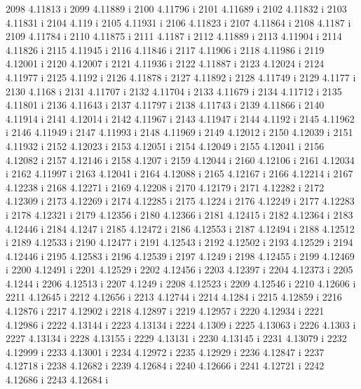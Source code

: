  2098  4.11813  i
 2099  4.11889  i
 2100  4.11796  i
 2101  4.11689  i
 2102  4.11832  i
 2103  4.11831  i
 2104  4.119  i
 2105  4.11931  i
 2106  4.11823  i
 2107  4.11864  i
 2108  4.1187  i
 2109  4.11784  i
 2110  4.11875  i
 2111  4.1187  i
 2112  4.11889  i
 2113  4.11904  i
 2114  4.11826  i
 2115  4.11945  i
 2116  4.11846  i
 2117  4.11906  i
 2118  4.11986  i
 2119  4.12001  i
 2120  4.12007  i
 2121  4.11936  i
 2122  4.11887  i
 2123  4.12024  i
 2124  4.11977  i
 2125  4.1192  i
 2126  4.11878  i
 2127  4.11892  i
 2128  4.11749  i
 2129  4.1177  i
 2130  4.1168  i
 2131  4.11707  i
 2132  4.11704  i
 2133  4.11679  i
 2134  4.11712  i
 2135  4.11801  i
 2136  4.11643  i
 2137  4.11797  i
 2138  4.11743  i
 2139  4.11866  i
 2140  4.11914  i
 2141  4.12014  i
 2142  4.11967  i
 2143  4.11947  i
 2144  4.1192  i
 2145  4.11962  i
 2146  4.11949  i
 2147  4.11993  i
 2148  4.11969  i
 2149  4.12012  i
 2150  4.12039  i
 2151  4.11932  i
 2152  4.12023  i
 2153  4.12051  i
 2154  4.12049  i
 2155  4.12041  i
 2156  4.12082  i
 2157  4.12146  i
 2158  4.1207  i
 2159  4.12044  i
 2160  4.12106  i
 2161  4.12034  i
 2162  4.11997  i
 2163  4.12041  i
 2164  4.12088  i
 2165  4.12167  i
 2166  4.12214  i
 2167  4.12238  i
 2168  4.12271  i
 2169  4.12208  i
 2170  4.12179  i
 2171  4.12282  i
 2172  4.12309  i
 2173  4.12269  i
 2174  4.12285  i
 2175  4.1224  i
 2176  4.12249  i
 2177  4.12283  i
 2178  4.12321  i
 2179  4.12356  i
 2180  4.12366  i
 2181  4.12415  i
 2182  4.12364  i
 2183  4.12446  i
 2184  4.1247  i
 2185  4.12472  i
 2186  4.12553  i
 2187  4.12494  i
 2188  4.12512  i
 2189  4.12533  i
 2190  4.12477  i
 2191  4.12543  i
 2192  4.12502  i
 2193  4.12529  i
 2194  4.12446  i
 2195  4.12583  i
 2196  4.12539  i
 2197  4.1249  i
 2198  4.12455  i
 2199  4.12469  i
 2200  4.12491  i
 2201  4.12529  i
 2202  4.12456  i
 2203  4.12397  i
 2204  4.12373  i
 2205  4.1244  i
 2206  4.12513  i
 2207  4.1249  i
 2208  4.12523  i
 2209  4.12546  i
 2210  4.12606  i
 2211  4.12645  i
 2212  4.12656  i
 2213  4.12744  i
 2214  4.1284  i
 2215  4.12859  i
 2216  4.12876  i
 2217  4.12902  i
 2218  4.12897  i
 2219  4.12957  i
 2220  4.12934  i
 2221  4.12986  i
 2222  4.13144  i
 2223  4.13134  i
 2224  4.1309  i
 2225  4.13063  i
 2226  4.1303  i
 2227  4.13134  i
 2228  4.13155  i
 2229  4.13131  i
 2230  4.13145  i
 2231  4.13079  i
 2232  4.12999  i
 2233  4.13001  i
 2234  4.12972  i
 2235  4.12929  i
 2236  4.12847  i
 2237  4.12718  i
 2238  4.12682  i
 2239  4.12684  i
 2240  4.12666  i
 2241  4.12721  i
 2242  4.12686  i
 2243  4.12684  i
